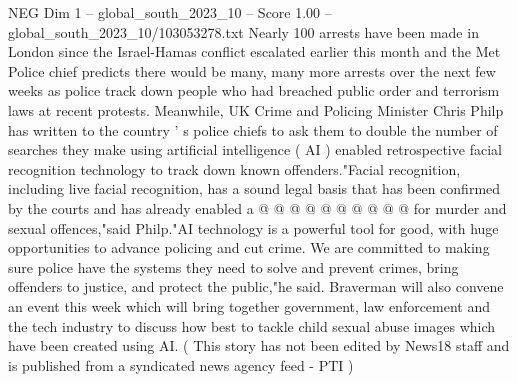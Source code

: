 \begin{textsample}{NEG Dim 1 – global\_south\_2023\_10 – Score 1.00 – global\_south\_2023\_10/103053278.txt}
Nearly 100 arrests have been made in London since the Israel-Hamas conflict escalated earlier this month and the Met Police chief predicts there would be many, many more arrests over the next few weeks as police track down people who had breached public order and terrorism laws at recent protests.
Meanwhile, UK Crime and Policing Minister Chris Philp has written to the country ' s police chiefs to ask them to double the number of searches they make using artificial intelligence ( AI ) enabled retrospective facial recognition technology to track down known offenders."Facial recognition, including live facial recognition, has a sound legal basis that has been confirmed by the courts and has already enabled a @ @ @ @ @ @ @ @ @ @ for murder and sexual offences,"said Philp."AI technology is a powerful tool for good, with huge opportunities to advance policing and cut crime.
We are committed to making sure police have the systems they need to solve and prevent crimes, bring offenders to justice, and protect the public,"he said.
Braverman will also convene an event this week which will bring together government, law enforcement and the tech industry to discuss how best to tackle child sexual abuse images which have been created using AI. ( This story has not been edited by News18 staff and is published from a syndicated news agency feed - PTI )

\end{textsample}
